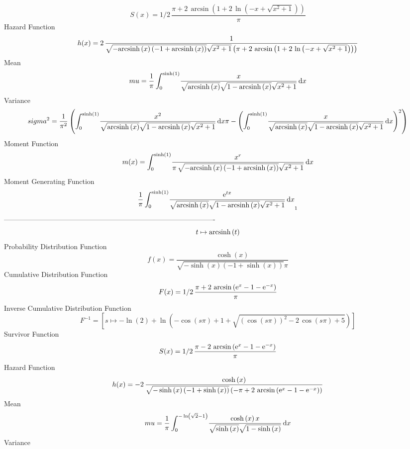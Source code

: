 \documentclass[12pt]{article}
\begin{document}
 $$ S(x)=1/2\,{\frac {\pi+2\,\arcsin \left( 1+2\,\ln  \left( -x+\sqrt {{x}^{2}+
1} \right)  \right) }{\pi}}
$$ Hazard Function 
 $$ h(x)=2\,{\frac {1}{\sqrt {-{\rm arcsinh} \left(x\right) \left( -1+
{\rm arcsinh} \left(x\right) \right) }\sqrt {{x}^{2}+1} \left( \pi+2\,
\arcsin \left( 1+2\,\ln  \left( -x+\sqrt {{x}^{2}+1} \right)  \right) 
 \right) }}
$$ Mean 
 $$ mu={\frac {1}{\pi}\int_{0}^{\sinh \left( 1 \right) }\!{\frac {x}{\sqrt {
{\rm arcsinh} \left(x\right)}\sqrt {1-{\rm arcsinh} \left(x\right)}
\sqrt {{x}^{2}+1}}}\,{\rm d}x}
$$ Variance 
 $$ sigma^2 = {\frac {1}{{\pi}^{2}} \left( \int_{0}^{\sinh \left( 1 \right) }\!{
\frac {{x}^{2}}{\sqrt {{\rm arcsinh} \left(x\right)}\sqrt {1-
{\rm arcsinh} \left(x\right)}\sqrt {{x}^{2}+1}}}\,{\rm d}x\pi- \left( 
\int_{0}^{\sinh \left( 1 \right) }\!{\frac {x}{\sqrt {{\rm arcsinh} 
\left(x\right)}\sqrt {1-{\rm arcsinh} \left(x\right)}\sqrt {{x}^{2}+1}
}}\,{\rm d}x \right) ^{2} \right) }
$$ Moment Function 
 $$ m(x) = \int_{0}^{\sinh \left( 1 \right) }\!{\frac {{x}^{r}}{\pi\,\sqrt {-
{\rm arcsinh} \left(x\right) \left( -1+{\rm arcsinh} \left(x\right)
 \right) }\sqrt {{x}^{2}+1}}}\,{\rm d}x
$$ Moment Generating Function 
 $${\frac {1}{\pi}\int_{0}^{\sinh \left( 1 \right) }\!{\frac {{{\rm e}^{t
x}}}{\sqrt {{\rm arcsinh} \left(x\right)}\sqrt {1-{\rm arcsinh} \left(
x\right)}\sqrt {{x}^{2}+1}}}\,{\rm d}x}_{{1}}
$$-------------------------------------------------------------------------------------------  \\$$t\mapsto {\rm arcsinh} \left(t\right)
$$Probability Distribution Function 
$$  f(x)={\frac {\cosh \left( x \right) }{\sqrt {-\sinh \left( x \right) 
 \left( -1+\sinh \left( x \right)  \right) }\pi}}
$$Cumulative Distribution Function  
 $$F(x)=1/2\,{\frac {\pi+2\,\arcsin \left( {{\rm e}^{x}}-1-{{\rm e}^{-x}}
 \right) }{\pi}}
$$ Inverse Cumulative Distribution Function 
  $$F^{-1} = [s\mapsto -\ln  \left( 2 \right) +\ln  \left( -\cos \left( s\pi
 \right) +1+\sqrt { \left( \cos \left( s\pi \right)  \right) ^{2}-2\,
\cos \left( s\pi \right) +5} \right) ]
$$Survivor Function 
 $$ S(x)=1/2\,{\frac {\pi-2\,\arcsin \left( {{\rm e}^{x}}-1-{{\rm e}^{-x}}
 \right) }{\pi}}
$$ Hazard Function 
 $$ h(x)=-2\,{\frac {\cosh \left( x \right) }{\sqrt {-\sinh \left( x \right) 
 \left( -1+\sinh \left( x \right)  \right) } \left( -\pi+2\,\arcsin
 \left( {{\rm e}^{x}}-1-{{\rm e}^{-x}} \right)  \right) }}
$$ Mean 
 $$ mu={\frac {1}{\pi}\int_{0}^{-\ln  \left( \sqrt {2}-1 \right) }\!{\frac {
\cosh \left( x \right) x}{\sqrt {\sinh \left( x \right) }\sqrt {1-
\sinh \left( x \right) }}}\,{\rm d}x}
$$ Variance 
\end{document}
